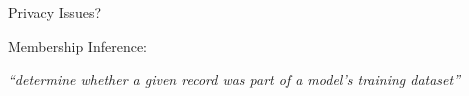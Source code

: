\documentclass[aspectratio=169,14pt]{beamer}
\begin{document}
\begin{frame}{Privacy Issues?}
  \begin{minipage}{0.4\linewidth}
    Membership Inference:
    \begin{center}
      \textit{``determine whether a given
      record was part of a model’s
      training dataset''}
    \end{center}
  \end{minipage}%
  ~~~~~~
  \begin{minipage}{0.5\linewidth}
  \end{minipage}
\end{frame}
\end{document}
